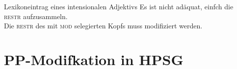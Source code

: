\begin{frame}
  {Lexikoneintrag eines intensionalen Adjektivs}
  \onslide<+->
  \onslide<+->
  Es ist nicht adäquat, einfch die \textsc{restr} aufzusammeln.\\
  \onslide<+->
  Die \textsc{restr} des mit \textsc{mod} selegierten Kopfs muss modifiziert werden.\\
  \onslide<+->
  \Halbzeile
  \centering 
\end{frame}


\section{PP-Modifkation in HPSG}

